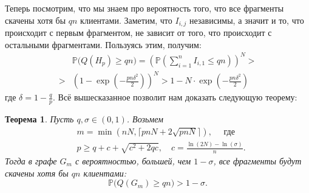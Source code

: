 \documentclass{matmex-diploma-custom}
\newcommand{\PRob}{\mathbb P}
\newcommand{\leqs}{\leqslant}
\newcommand{\geqs}{\geqslant}
\newtheorem{theorem}{Теорема}
\theoremstyle{named}
\begin{document}
Теперь посмотрим, что мы знаем про вероятность того, что все фрагменты скачены хотя бы $qn$ клиентами.
Заметим, что $I_{i,j}$ независимы, а значит и то, что происходит с первым фрагментом, не зависит от того, 
что происходит с остальными фрагментами. Пользуясь этим, получим:
\begin{equation}\label{mod1_pr}\begin{aligned}
&\PRob\big(Q(H_p) \geqs q n\big) = \left( \PRob\left(\sum_{i=1}^n I_{i,1} \leqs qn\right)  \right)^N >
\\
>&\left( 1 - \exp\left(- \frac{pn \delta^2}{2} \right) \right)^N > 1 - N \cdot \exp\left(- \frac{pn \delta^2}{2} \right) 
\end{aligned}\end{equation}
где $\delta = 1 - \frac{q}{p}$. Всё вышесказанное позволит нам доказать следующую теорему:

\begin{theorem}\label{t1}
Пусть $q, \sigma \in (0, 1)$. Возьмем 
\begin{align}
& m = \min(nN, \lceil pnN + 2\sqrt{pnN} \rceil), \quad \text{ где} \\
& p \geqs q + c + \sqrt{c^2+2qc}, \quad c = \frac{\ln(2N) - \ln(\sigma)}{n}.
\end{align}
Тогда в графе $G_m$ с вероятностью, большей, чем $1 - \sigma$, все фрагменты будут скачены хотя бы $qn$ клиентами:
\begin{equation}
\PRob\big(Q(G_m) \geqs qn\big) > 1 - \sigma.
\end{equation}
\end{theorem}
\end{document}
